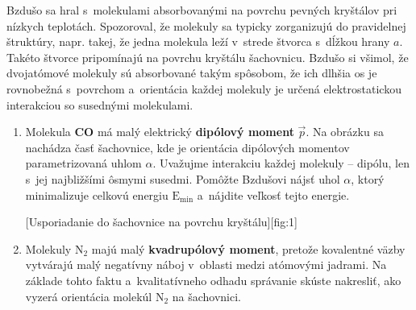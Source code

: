 Bzdušo sa hral s~molekulami absorbovanými na povrchu pevných kryštálov pri nízkych teplotách.
Spozoroval, že molekuly sa typicky zorganizujú do pravidelnej štruktúry, napr. takej,
že jedna molekula leží v~strede štvorca s~dĺžkou hrany $a$.
Takéto štvorce pripomínajú na povrchu kryštálu šachovnicu.
Bzdušo si všimol, že dvojatómové molekuly sú absorbované takým spôsobom,
že ich dlhšia os je rovnobežná s~povrchom a~orientácia každej molekuly je
určená elektrostatickou interakciou so susednými molekulami.

\begin{enumerate}
	\item Molekula \textbf{CO} má malý elektrický \textbf{dipólový moment} $\vec{p}$.
		Na obrázku sa nachádza časť šachovnice, kde je orientácia dipólových momentov parametrizovaná uhlom $\alpha$.
		Uvažujme interakciu každej molekuly -- dipólu, len s~jej najbližšími ôsmymi susedmi.
		Pomôžte Bzdušovi nájsť uhol $\alpha$, ktorý minimalizuje celkovú energiu $\mathrm{E}_\text{min}$
		a~nájdite veľkosť tejto energie.
		
		[Usporiadanie do šachovnice na povrchu kryštálu][fig:1]

	\item Molekuly $\text{N}_2$ majú malý \textbf{kvadrupólový moment}, pretože kovalentné väzby vytvárajú
		malý negatívny náboj v~oblasti medzi atómovými jadrami. Na základe tohto faktu a~kvalitatívneho odhadu
		správanie skúste nakresliť, ako vyzerá orientácia molekúl $\text{N}_2$ na šachovnici.
\end{enumerate}
